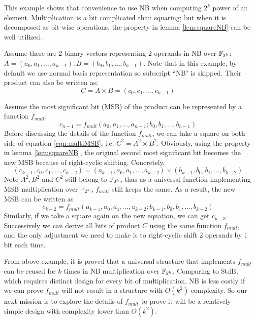 This example shows that convenience to use NB when computing $2^k$ power of an element.
Multiplication is a bit complicated than squaring; but when it is decomposed as bit-wise
operations, the property in lemma \ref{lem:squareNB} can be well utilized.

\begin{Example}
Assume there are 2 binary vectors representing 2 operands in NB over ${\mathbb{F}}_{2^k}$: 
$A = (a_0, a_1, \dots, a_{k-1}), B = (b_0, b_1, \dots, b_{k-1})$. Note that in this example, 
by default we use normal basis representation so subscript ``NB" is skipped. Their product can also be written
as: $$C = A\times B = (c_0, c_1, \dots, c_{k-1})$$

Assume the most significant bit (MSB) of the product can be represented by a function $f_{mult}$: 
\begin{equation}
\label{eqn:multiMSB}
c_{n-1} = f_{mult}(a_0, a_1, \dots, a_{n-1}; b_0, b_1, \dots, b_{n-1})
\end{equation}
Before discussing the details of the function $f_{mult}$, we can take 
a square on both side of equation \ref{eqn:multiMSB}, i.e. $C^2 = A^2\times B^2$.
Obviously, using the property in lemma \ref{lem:squareNB}, the original second most significant bit 
becomes the new MSB because of right-cyclic shifting. 
Concretely, 
$$(c_{k-1},c_0,c_1,\dots,c_{k-2}) = (a_{k-1},a_0,a_1,\dots,a_{k-2})\times(b_{k-1},b_0,b_1,\dots,b_{k-2})$$
Note $A^2, B^2$ and $C^2$ still belong to ${\mathbb{F}}_{2^k}$, thus as a universal function implementing MSB multiplication
over ${\mathbb{F}}_{2^k}$, $f_{mult}$ still keeps the same. As a result, the new MSB can be written as 
\begin{equation}
\label{eqn:shiftMSB}
c_{k-2} = f_{mult}(a_{k-1}, a_0, a_1, 
\dots, a_{k-2}; b_{k-1}, b_0, b_1, \dots, b_{k-2})
\end{equation}
Similarly, if we take a square again on the new equation, we can get $c_{k-3}$.
Successively we can derive all bits of product $C$ using the same function $f_{mult}$, and the only
adjustment we need to make is to right-cyclic shift 2 operands by 1 bit each time.
\end{Example}

From above example, it is proved that a universal structure that implements $f_{mult}$ can be reused
for $k$ times in NB multiplication over ${\mathbb{F}}_{2^k}$. Comparing to StdB, which requires distinct design 
for every bit of multiplication, NB is less costly if we can prove $f_{mult}$ will not result in 
a structure with $O(k^2)$ complexity. So our next mission is to explore the details of $f_{mult}$
to prove it will be a relatively simple design with complexity lower than $O(k^2)$.

